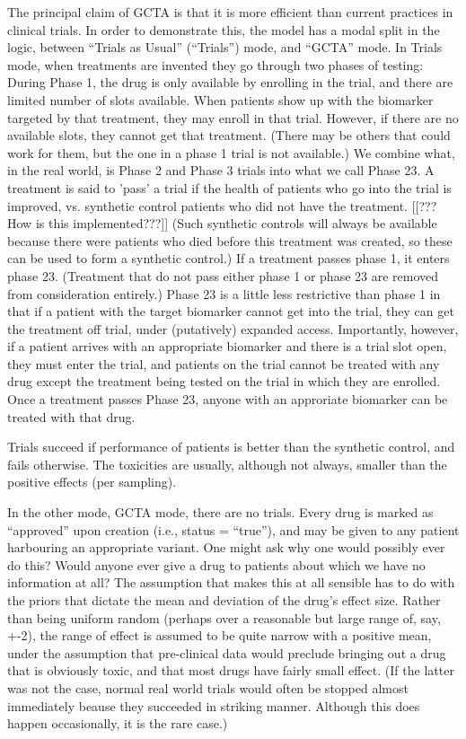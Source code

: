 \documentclass[12pt]{article}
\begin{document}
The principal claim of GCTA is that it is more efficient than current
practices in clinical trials. In order to demonstrate this, the model
has a modal split in the logic, between ``Trials as Usual''
(``Trials'') mode, and ``GCTA'' mode. In Trials mode, when treatments
are invented they go through two phases of testing: During Phase 1,
the drug is only available by enrolling in the trial, and there are
limited number of slots available. When patients show up with the
biomarker targeted by that treatment, they may enroll in that
trial. However, if there are no available slots, they cannot get that
treatment. (There may be others that could work for them, but the one
in a phase 1 trial is not available.) We combine what, in the real
world, is Phase 2 and Phase 3 trials into what we call Phase 23. A
treatment is said to 'pass' a trial if the health of patients who go
into the trial is improved, vs. synthetic control patients who did not
have the treatment. [[???  How is this implemented???]] (Such
synthetic controls will always be available because there were
patients who died before this treatment was created, so these can be
used to form a synthetic control.) If a treatment passes phase 1, it
enters phase 23. (Treatment that do not pass either phase 1 or phase
23 are removed from consideration entirely.) Phase 23 is a little less
restrictive than phase 1 in that if a patient with the target
biomarker cannot get into the trial, they can get the treatment off
trial, under (putatively) expanded access. Importantly, however, if a
patient arrives with an appropriate biomarker and there is a trial
slot open, they must enter the trial, and patients on the trial cannot
be treated with any drug except the treatment being tested on the
trial in which they are enrolled. Once a treatment passes Phase 23,
anyone with an approriate biomarker can be treated with that drug.

Trials succeed if performance of patients is better than the synthetic
control, and fails otherwise. The toxicities are usually, although
not always, smaller than the positive effects (per sampling).

In the other mode, GCTA mode, there are no trials. Every drug is
marked as ``approved'' upon creation (i.e., status = ``true''), and
may be given to any patient harbouring an appropriate variant. One
might ask why one would possibly ever do this? Would anyone ever give
a drug to patients about which we have no information at all? The
assumption that makes this at all sensible has to do with the priors
that dictate the mean and deviation of the drug's effect size. Rather
than being uniform random (perhaps over a reasonable but large range
of, say, +-2), the range of effect is assumed to be quite narrow with
a positive mean, under the assumption that pre-clinical data would
preclude bringing out a drug that is obviously toxic, and that most
drugs have fairly small effect. (If the latter was not the case,
normal real world trials would often be stopped almost immediately
beause they succeeded in striking manner. Although this does happen
occasionally, it is the rare case.)
\end{document}
